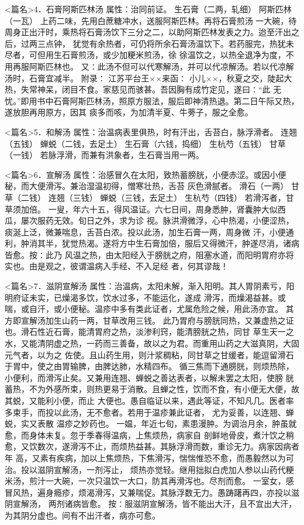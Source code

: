 \documentclass[a4paper,12pt,UTF8,twoside]{ctexbook}
\begin{document}
<篇名>4．石膏阿斯匹林汤
属性：治同前证。 
生石膏（二两，轧细） 阿斯匹林（一瓦） 
上药二味，先用白蔗糖冲水，送服阿斯匹林。再将石膏煎汤 
一大碗，待周身正出汗时，乘热将石膏汤饮下三分之二，以助阿斯匹林发表之力。迨至汗出之后，过两三点钟， 
犹觉有余热者，可仍将所余石膏汤温饮下。若药服完，热犹未尽者，可但用生石膏煎汤，或少加粳米煎汤，徐 
徐温饮之，以热全退净为度，不用再服阿斯匹林也。 
又∶此汤不但可以代寒解汤，并可以代凉解汤。若以代凉解汤时，石膏宜减半。 
附录∶ 
江苏平台王××来函∶ 
小儿××，秋夏之交，陡起大热，失常神呆，闭目不食。家慈见而骇甚。吾因胸有成竹定见，遂曰∶“此 
无忧。”即用书中石膏阿斯匹林汤，照原方服法，服后即神清热退。第二日午际又热，遂放胆再用原方，因其 
痰多而咳，为加清半夏、牛蒡子，服之全愈。 


<篇名>5．和解汤
属性：治温病表里俱热，时有汗出，舌苔白，脉浮滑者。 
连翘（五钱） 蝉蜕（二钱，去足土） 生石膏（六钱，捣细） 生杭芍（五钱） 甘草（一钱） 
若脉浮滑，而兼有洪象者，生石膏当用一两。 


<篇名>6．宣解汤
属性：治感冒久在太阳，致热蓄膀胱，小便赤涩。或因小便秘，而大便滑泻。兼治湿温初得，憎寒壮热，舌苔 
灰色滑腻者。 
滑石（一两） 甘草（二钱） 连翘（三钱） 蝉蜕（三钱，去足土） 生杭芍（四钱） 
若滑泻者，甘草须加倍。 
一叟，年六十五，得风温证。六七日间，周身悉肿，肾囊肿大似西瓜，屡次服药无效。旬日之外，求为诊 
视。脉洪滑微浮，心中热渴，小便涩热，痰涎上泛，微兼喘息，舌苔白浓。投以此汤，加生石膏一两，周身微 
汗，小便通利，肿消其半，犹觉热渴。遂将方中生石膏加倍，服后又得微汗，肿遂尽消，诸病皆愈。按∶此乃 
风温之热，由太阳经入于膀胱之府，阻塞水道，而阳明胃府亦将实也。由是观之，彼谓温病入手经、不入足经 
者，何其谬哉！ 


<篇名>7．滋阴宣解汤
属性：治温病，太阳未解，渐入阳明。其人胃阴素亏，阳明府证未实，已燥渴多饮，饮水过多，不能运化，遂成 
滑泻，而燥渴益甚。或喘，或自汗，或小便秘。温疹中多有类此证者，尤属危险之候，用此汤亦宜。 
其方即宣解汤加生山药一两，甘草改用三钱。 
此乃胃府与膀胱同热，又兼虚热之证也。滑石性近石膏，能清胃府之热，淡渗利窍，能清膀胱之热，同甘 
草生天一之水，又能清阴虚之热，一药而三善备，故以之为君。而重用山药之大滋真阴，大固元气者，以为之 
佐使。且山药生用，则汁浆稠粘，同甘草之甘缓者，能逗留滑石于胃中，使之由胃输脾，由脾达肺，水精四布。 
循三焦而下通膀胱，则烦热除，小便利，而滑泻止矣。又兼用连翘、蝉蜕之善达表者，以解未罢之太阳，使膀 
胱蓄热，不为外感所束，则热更易于消散。且蝉之性，饮而不食，有小便无大便，故其蜕，又能利小便，而止 
大便也。愚自临证以来，遇此等证，不知凡几。医者率多束手，而投以此汤，无不愈者。若用于温疹兼此证者， 
尤为妥善，以连翘、蝉蜕，实又表散 
温疹之妙药也。 
一媪，年近七旬，素患漫肿。为调治月余，肿虽就愈，而身体未复。忽于季春得温病，上焦烦热，病家自 
剖鲜地骨皮，煮汁饮之稍愈，又饮数次，遂滑泻不止，而烦热益甚。其脉浮滑而数，重诊无力。病家因病者年 
高，又素有疾病，加以上焦烦热，下焦滑泻，惴惴惟恐不愈，而愚毅然以为可治。投以滋阴宣解汤，一剂泻止， 
烦热亦觉轻。继用拙拟白虎加人参以山药代粳米汤，煎汁一大碗，一次只温饮一大口，防其再滑泻也。尽剂而愈。 
一室女，感冒风热，遍身瘾疹，烦渴滑泻，又兼喘促。其脉浮数无力。愚踌躇再四，亦投以滋阴宣解汤， 
两剂诸病皆愈。 
按∶服滋阴宣解汤，皆不能出大汗，且不宜出大汗，为其阴分虚也。间有不出汗者，病亦可愈。 
\end{document}
